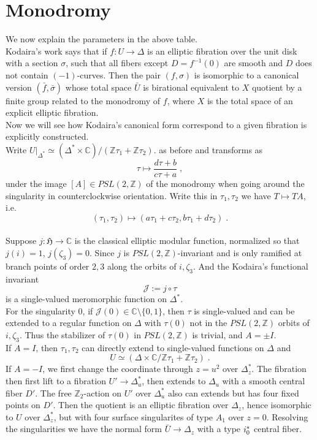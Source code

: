 \section{Monodromy}
\indent  We now explain the parameters in the above table.\\ \indent
Kodaira's work\cite{kodaira1963compact} says that if $f\colon U\rightarrow \Delta$ is an elliptic fibration over the unit disk with a section $\sigma$, such that all fibers except $D=f^{-1}(0)$ are smooth and $D$ does not contain $(-1)$-curves. Then the pair $(f,\sigma)$ is isomorphic to a canonical version $(\bar{f},\bar{\sigma})$ whose total space $\bar{U}$ is birational equivalent to $X$ quotient by a finite group related to the monodromy of $f$, where $X$ is the total space of an explicit elliptic fibration.\\ \indent
Now we will see how Kodaira's canonical form correspond to a given fibration is explicitly constructed.\\ \indent
Write $U|_{\Delta^*}\simeq(\Delta^*\times\mathbb{C})/(\mathbb{Z}\tau_1+\mathbb{Z}\tau_2).$ as before and transforms as
$$\tau \mapsto \frac{d\tau+b}{c\tau+a}\; ,$$
under the image $[A]\in PSL(2,\mathbb{Z})$ of the monodromy when going around the singularity in counterclockwise orientation. Write this in $\tau_1,\tau_2$ we have $T\mapsto TA$, i.e.
$$(\tau_1,\tau_2)\mapsto(a\tau_1+c\tau_2,b\tau_1+d\tau_2 )\; .$$\\ \indent
Suppose $j\colon\mathfrak{H}\rightarrow\mathbb{C}$ is the classical elliptic modular function, normalized so that $j(i)=1$, $j(\zeta_3)=0$. Since $j$ is $PSL(2,\mathbb{Z})$-invariant and is only ramified at branch points of order $2,3$ along the orbits of $i,\zeta_3$. And the Kodaira's functional invariant 
$$\mathscr{J}:=j\circ \tau$$
is a single-valued meromorphic function on $\Delta^*$.\\ \indent
For the singularity 0, if $\mathscr{J}(0)\in\mathbb{C}\setminus \{0,1\}$, then $\tau$ is single-valued and can be extended to a regular function on $\Delta$ with $\tau(0)$ not in the $PSL(2,\mathbb{Z})$ orbits of $i,\zeta_3$. Thus the stabilizer of $\tau(0)$ in $PSL(2,\mathbb{Z})$ is trivial, and $A=\pm I$.\\ \indent
If $A=I$, then $\tau_1,\tau_2$ can directly extend to single-valued functions on $\Delta$ and $$U\simeq (\Delta\times\mathbb{C}/\mathbb{Z}\tau_1+\mathbb{Z}\tau_2)\; .$$
\indent If $A=-I$, we first change the coordinate through $z=u^2$ over $\Delta_z^*$. The fibration then first lift to a fibration $U'\rightarrow \Delta_u^*$, then extends to $\Delta_u$ with a smooth central fiber $D'$. The free $\mathbb{Z}_2$-action on $U'$ over $\Delta_u^*$ also can extends but has four fixed points on $D'$. Then the quotient is an elliptic fibration over $\Delta_z$, hence isomorphic to $U$ over $\Delta_z^*$, but with four surface singularites of type $A_1$ over $z=0$. Resolving the singularities we have the normal form $\bar{U}\rightarrow \Delta_z$ with a type $\uppercase\expandafter{\romannumeral1}_0^*$ central fiber. \\ \indent
